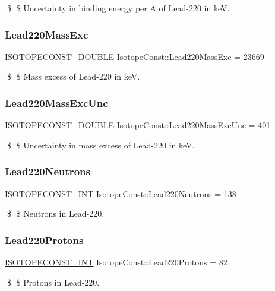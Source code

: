 \$ \$ Uncertainty in binding energy per A of Lead-\/220 in keV. \mbox{\label{group___isotope_const-_lead-_pb220_ga68f1703be32ec467b8c35fdfec5ad4c2}} 
\subsubsection{\texorpdfstring{Lead220\+Mass\+Exc}{Lead220MassExc}}
{\footnotesize\ttfamily \mbox{\hyperlink{group___isotope_const-_macros_ga8f45a7272ce02c0b4c65c44636ed719a}{I\+S\+O\+T\+O\+P\+E\+C\+O\+N\+S\+T\+\_\+\+D\+O\+U\+B\+LE}} Isotope\+Const\+::\+Lead220\+Mass\+Exc = 23669}

\$ \$ Mass excess of Lead-\/220 in keV. \mbox{\label{group___isotope_const-_lead-_pb220_gadf76aa2ec877c5730400b29593669d18}} 
\subsubsection{\texorpdfstring{Lead220\+Mass\+Exc\+Unc}{Lead220MassExcUnc}}
{\footnotesize\ttfamily \mbox{\hyperlink{group___isotope_const-_macros_ga8f45a7272ce02c0b4c65c44636ed719a}{I\+S\+O\+T\+O\+P\+E\+C\+O\+N\+S\+T\+\_\+\+D\+O\+U\+B\+LE}} Isotope\+Const\+::\+Lead220\+Mass\+Exc\+Unc = 401}

\$ \$ Uncertainty in mass excess of Lead-\/220 in keV. \mbox{\label{group___isotope_const-_lead-_pb220_gae9c7e654f02408f6508fe747a081cbbb}} 
\subsubsection{\texorpdfstring{Lead220\+Neutrons}{Lead220Neutrons}}
{\footnotesize\ttfamily \mbox{\hyperlink{group___isotope_const-_macros_ga5f18360b3e99483a35c32d789e62621c}{I\+S\+O\+T\+O\+P\+E\+C\+O\+N\+S\+T\+\_\+\+I\+NT}} Isotope\+Const\+::\+Lead220\+Neutrons = 138}

\$ \$ Neutrons in Lead-\/220. \mbox{\label{group___isotope_const-_lead-_pb220_ga0b3c0adc6d6d3987992f385495edb90f}} 
\subsubsection{\texorpdfstring{Lead220\+Protons}{Lead220Protons}}
{\footnotesize\ttfamily \mbox{\hyperlink{group___isotope_const-_macros_ga5f18360b3e99483a35c32d789e62621c}{I\+S\+O\+T\+O\+P\+E\+C\+O\+N\+S\+T\+\_\+\+I\+NT}} Isotope\+Const\+::\+Lead220\+Protons = 82}

\$ \$ Protons in Lead-\/220. 